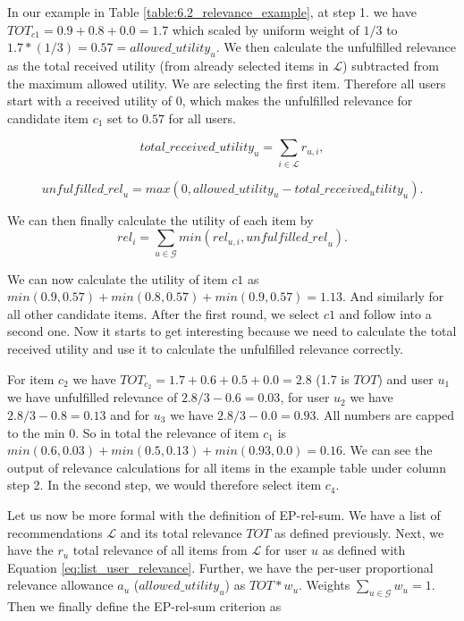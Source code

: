 In our example in Table \ref{table:6.2_relevance_example}, at step 1. we have $TOT_{c1} = 0.9 + 0.8 + 0.0 = 1.7$ which scaled by uniform weight of $1/3$ to $ 1.7 * (1/3) = 0.57 = allowed\_utility_u$. We then calculate the unfulfilled relevance as the total received utility (from already selected items in $\mathcal{L}$) subtracted from the maximum allowed utility. We are selecting the first item. Therefore all users start with a received utility of 0, which makes the unfulfilled relevance for candidate item $c_1$ set to $0.57$ for all users.

\begin{equation}\label{eq:list_user_relevance}
    \mathit{total\_received\_utility}_u= \sum_{i \in \mathcal{L}} r_{u,i},
\end{equation}

\begin{equation}
    \mathit{unfulfilled\_rel}_u= max(0, allowed\_utility_u - \mathit{total\_received_utility}_u).
\end{equation}

We can then finally calculate the utility of each item by
\begin{equation}
    \mathit{rel}_i= \sum_{u \in \mathcal{G}} min(rel_{u,i}, \mathit{unfulfilled\_rel}_u).
\end{equation}


We can now calculate the utility of item $c1$ as $min(0.9, 0.57) + min(0.8, 0.57) + min(0.9, 0.57) = 1.13$. And similarly for all other candidate items. After the first round, we select $c1$ and follow into a second one. Now it starts to get interesting because we need to calculate the total received utility and use it to calculate the unfulfilled relevance correctly.

For item $c_2$ we have $TOT_{c_2} = 1.7 + 0.6 + 0.5 + 0.0 = 2.8$ (1.7 is $TOT$) and user $u_1$ we have unfulfilled relevance of $2.8 / 3 - 0.6 = 0.03$, for user $u_2$ we have $2.8 / 3 - 0.8 = 0.13$ and for $u_3$ we have $2.8 / 3 - 0.0 = 0.93$. All numbers are capped to the min 0. So in total the relevance of item $c_1$ is $min(0.6, 0.03) + min(0.5, 0.13) + min(0.93, 0.0) = 0.16$. We can see the output of relevance calculations for all items in the example table under column step 2. In the second step, we would therefore select item $c_4$.

Let us now be more formal with the definition of EP-rel-sum. We have a list of recommendations $\mathcal{L}$ and its total relevance $TOT$ as defined previously. Next, we have the $r_u$ total relevance of all items from $\mathcal{L}$ for user $u$ as defined with Equation \ref{eq:list_user_relevance}. Further, we have the per-user proportional relevance allowance $a_u$ ($\mathit{allowed\_utility_u}$)  as $TOT * w_u$. Weights $\sum_{u \in \mathcal{G}} w_u = 1$. 
Then we finally define the EP-rel-sum criterion as

